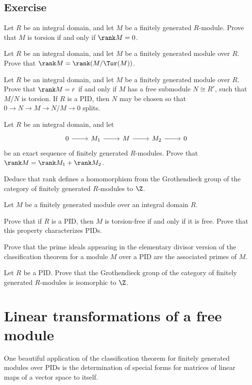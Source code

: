 \subsection{Exercise}
\begin{exercise}
Let $R$ be an integral domain, and let $M$ be a finitely generated $R$-module. Prove that $M$ is torsion if and only if $\rank M=0$.
\end{exercise}
\begin{exercise}
Let $R$ be an integral domain, and let $M$ be a finitely generated module over $R$. Prove that $\rank M=\rank(M/\Tor(M))$.
\end{exercise}
\begin{exercise}
Let $R$ be an integral domain, and let $M$ be a finitely generated module over $R$. Prove that $\rank M=r$ if and only if $M$ has a free submodule $N\cong R^r$, such that $M/N$ is torsion.
If $R$ is a PID, then $N$ may be chosen so that $0\to N\to M\to N/M\to 0$ splits.
\end{exercise}
\begin{exercise}
Let $R$ be an integral domain, and let
\[\begin{tikzcd}
0\ar[r]&M_1\ar[r]&M\ar[r]&M_2\ar[r]&0
\end{tikzcd}\]
be an exact sequence of finitely generated $R$-modules. Prove that $\rank M=\rank M_1+\rank M_2$.\par
Deduce that rank defines a homomorphism from the Grothendieck group of the category of finitely generated $R$-modules to $\Z$.
\end{exercise}
\begin{exercise}
Let $M$ be a finitely generated module over an integral domain $R$.\par
Prove that if $R$ is a PID, then $M$ is torsion-free if and only if it is free. Prove that this property characterizes PIDs.
\end{exercise}
\begin{exercise}
Prove that the prime ideals appearing in the elementary divisor version of the classification theorem for a module $M$ over a PID are the associated primes of $M$.
\end{exercise}
\begin{exercise}
Let $R$ be a PID. Prove that the Grothendieck group of the category of finitely generated $R$-modules is isomorphic to $\Z$.
\end{exercise}
\section{Linear transformations of a free module}
One beautiful application of the classification theorem for finitely generated modules over PIDs is the determination of special forms for matrices of linear maps of a vector space to itself.
